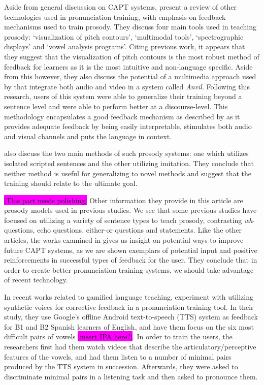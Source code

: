 \documentclass
[
    a4paper,
    twoside,
    12pt,
]
{report}
\begin{document}
Aside from general discussion on CAPT systems, \textcite{chun2008}
present a review of other technologies used in pronunciation training,
with emphasis on feedback mechanisms used to train prosody. They discuss
four main tools used in teaching prosody: `visualization of pitch
contours', `multimodal tools', `spectrographic displays' and `vowel
analysis programs'. Citing previous work, it appears that they suggest
that the visualization of pitch contours is the most robust method of
feedback for learners as it is the most intuitive and non-language
specific. Aside from this however, they also discuss the potential of a
multimedia approach used by \textcite{hardison2005} that integrate both
audio and video in a system called \textit{Anvil}. Following this
research, users of this system were able to generalize their training
beyond a sentence level and were able to perform better at a
discourse-level. This methodology encapsulates a good feedback mechanism
as described by \textcite{neri2002} as it provides adequate feedback by
being easily interpretable, stimulates both audio and visual channels
and puts the language in context.

\textcite{chun2008} also discuss the two main methods of such prosody
systems: one which utilizes isolated scripted sentences and the other
utilizing imitation. They conclude that neither method is useful for
generalizing to novel methods and suggest that the training should
relate to the ultimate goal.

\colorbox{magenta}{[This part needs polishing]} Other information they
provide in this article are prosody models used in previous studies. We
see that some previous studies have focused on utilizing a variety of
sentence types to teach prosody, contrasting \textit{wh}-questions, echo
questions, either-or questions and statements. Like the other articles,
the works examined in \textcite{chun2008} gives us insight on potential
ways to improve future CAPT systems, as we are shown exemplars of
potential input and positive reinforcements in successful types of
feedback for the user. They conclude that in order to create better
pronunciation training systems, we should take advantage of recent
technology.

In recent works related to gamified language teaching,
\parencite{tejedor-garcia2017} experiment with utilizing synthetic
voices for corrective feedback in a pronunciation training tool. In
their study, they use Google's offline Android text-to-speech (TTS)
system as feedback for B1 and B2 Spanish learners of English, and have
them focus on the six most difficult pairs of vowels
\colorbox{magenta}{[insert IPA here?]}. In order to train the users, the
researchers first had them watch videos that describe the
articulatory/perceptive features of the vowels, and had them listen to a
number of minimal pairs produced by the TTS system in succession.
Afterwards, they were asked to discriminate minimal pairs in a listening
task and then asked to pronounce them.
\end{document}
